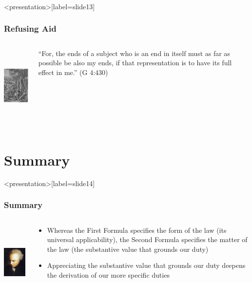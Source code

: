 \begin{frame}<presentation>[label=slide13]
    \frametitle{Refusing Aid}
        \begin{columns}
            \begin{column}{3cm}
                \includegraphics[height=4cm]{../../graphics/samaritan.jpg}
            \end{column}
            \begin{column}{7cm}
                ``For, the ends of a subject who is an end in itself must as far as possible be also my ends, if that representation is to have its full effect in me.'' (G 4:430) 
            \end{column}
        \end{columns}
\end{frame}


\section{Summary}

\begin{frame}<presentation>[label=slide14]
    \frametitle{Summary}
        \begin{columns}
            \begin{column}{3cm}
                \includegraphics[height=4cm]{../../graphics/kant.jpg}
            \end{column}
            \begin{column}{7cm}
                \begin{itemize}
                    \item Whereas the First Formula specifies the form of the law (its universal applicability), the Second Formula specifies the matter of the law (the substantive value that grounds our duty)
                    \item Appreciating the substantive value that grounds our duty deepens the derivation of our more specific duties
                \end{itemize}
            \end{column}
        \end{columns}
\end{frame}


